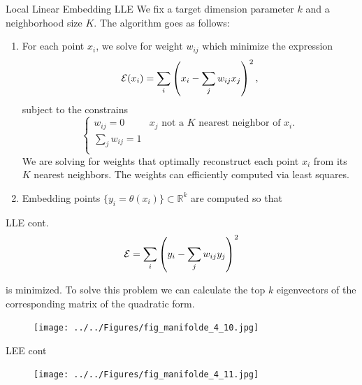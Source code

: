 \documentclass{beamer}
\begin{document}
\begin{frame}{Local Linear Embedding LLE}
	We fix a target dimension parameter $k$ and a neighborhood size $K$. The algorithm goes as follows:
	\begin{enumerate}
		\item For each point $x_i$, we solve for weight $w_{ij}$ which minimize the expression
		\begin{equation*}
			{\cal E}(x_i)= \sum_i \left( x_i - \sum_j w_{ij} x_j \right)^2, 
		\end{equation*}
		subject to the constrains
		\begin{equation*}
			\begin{cases}
				w_{ij}=0 & \text{$x_j$ not a $K$ nearest neighbor of $x_i$}.\\
				\sum_j w_{ij}=1 & \\
			\end{cases}
		\end{equation*}
	We are solving for weights that optimally reconstruct each point $x_i$ from its $K$ nearest neighbors. The weights can efficiently computed via least squares.
	\item Embedding points $\{ y_i = \theta(x_i)\} \subset \mathbb{R}^k$ are computed so that

	\end{enumerate}
\end{frame}

\begin{frame}{LLE cont.}
		\begin{equation*}
		{\cal E}= \sum_i \left( y_i - \sum_j w_{ij}y_j \right)^2
	\end{equation*}

		is minimized. To solve this problem we can calculate the top $k$ eigenvectors of the corresponding matrix of the quadratic form. 
	\begin{figure}[h]
	\centering
	\texttt{[image: ../../Figures/fig\_manifolde\_4\_10.jpg]}
\end{figure}			
		
\end{frame}

\begin{frame}{LEE cont}
		\begin{figure}[h]
		\centering
		\texttt{[image: ../../Figures/fig\_manifolde\_4\_11.jpg]}
	\end{figure}			
\end{frame}
\end{document}

